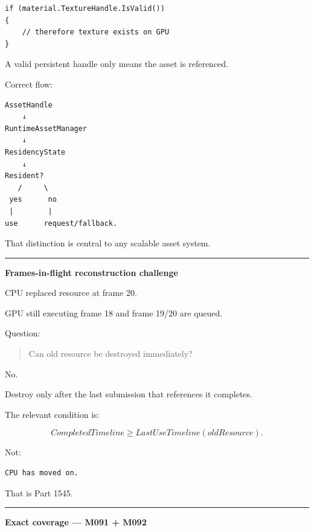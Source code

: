 \begin{verbatim}
if (material.TextureHandle.IsValid())
{
    // therefore texture exists on GPU
}
\end{verbatim}

A valid persistent handle only means the asset is referenced.

Correct flow:

\begin{verbatim}
AssetHandle
    ↓
RuntimeAssetManager
    ↓
ResidencyState
    ↓
Resident?
   /     \
 yes      no
 |        |
use      request/fallback.
\end{verbatim}

That distinction is central to any scalable asset system.

\begin{center}\rule{0.5\linewidth}{0.5pt}\end{center}

\textbf{Frames-in-flight reconstruction challenge}

CPU replaced resource at frame 20.

GPU still executing frame 18 and frame 19/20 are queued.

Question:

\begin{quote}
Can old resource be destroyed immediately?
\end{quote}

No.

Destroy only after the last submission that references it completes.

The relevant condition is:

\[
CompletedTimeline
\ge
LastUseTimeline(oldResource).
\]

Not:

\begin{verbatim}
CPU has moved on.
\end{verbatim}

That is Part 1545.

\begin{center}\rule{0.5\linewidth}{0.5pt}\end{center}

\textbf{Exact coverage --- M091 + M092}

